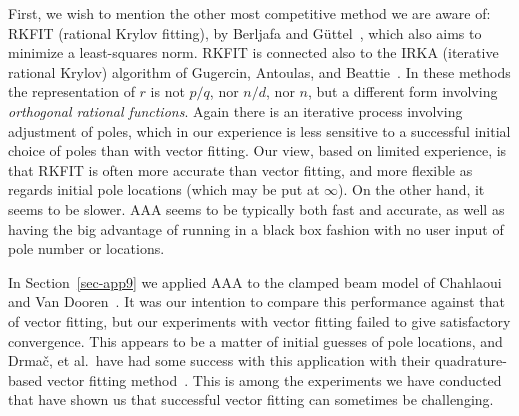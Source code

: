 \documentclass[final]{siamltex}
\begin{document}
First, we wish to mention the other most competitive method we are
aware of: RKFIT (rational Krylov fitting), by Berljafa
and G\"uttel~\cite{bg1,bg}, which also
aims to minimize a least-squares norm.  RKFIT is connected also
to the IRKA (iterative rational Krylov) algorithm of
Gugercin, Antoulas, and Beattie~\cite{gab}.
In these methods the representation of $r$ is not
$p/q$, nor $n/d$, nor $n$, but a different form involving
{\em orthogonal rational functions}.  Again there is an iterative
process involving adjustment of poles, which in our experience is
less sensitive to a successful initial choice
of poles than with vector fitting.  Our view, based on limited
experience, is that RKFIT is often more accurate than vector
fitting, and more flexible as regards initial pole locations
(which may be put at $\infty$).  On the other hand, it seems
to be slower.  AAA seems to be typically both fast and
accurate, as well as having the big advantage of running in a black
box fashion with no user input of pole number or locations.

In Section~\ref{sec-app9} we applied AAA to the clamped beam
model of Chahlaoui and Van Dooren~\cite{chdo}.  It was our intention
to compare this performance against that of vector fitting, but our
experiments with vector fitting failed to give satisfactory convergence.
This appears to be a matter of initial guesses of pole locations, and
Drma\v c, et al.\ have had some success with this application
with their quadrature-based vector fitting method~\cite{dgb}.
This is among the experiments we have conducted that have shown
us that successful vector fitting can sometimes be challenging.
\end{document}
